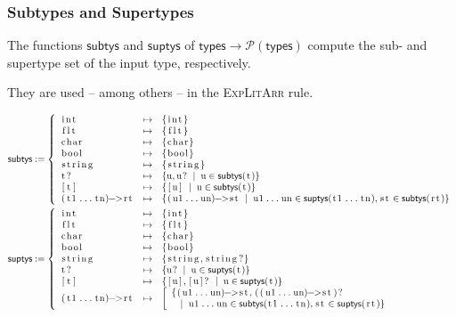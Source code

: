 \documentclass{article}
\newcommand{\code}[1]{\lstinline[columns=fixed]{#1}}
\newcommand{\mc}[1]{\textnormal{\code{#1}}}
\begin{document}
			\subsubsection{Subtypes and Supertypes}
			
				The functions $\mathsf{subtys}$ and $\mathsf{suptys}$ of $\mathsf{types}\to\mathcal{P}(\mathsf{types})$ compute the sub- and supertype set of the input type, respectively.
				
				They are used -- among others -- in the \textsc{ExpLitArr} rule.
				
				\begin{align*}
					\mathsf{subtys} &:=
						\left\{
							\begin{array}{lll}
								\mc{int} & \mapsto & \{\mc{int}\}\\
								\mc{flt} & \mapsto & \{\mc{flt}\}\\
								\mc{char} & \mapsto & \{\mc{char}\}\\
								\mc{bool} & \mapsto & \{\mc{bool}\}\\
								\mc{string} & \mapsto & \{\mc{string}\}\\
								\mc{t?} & \mapsto & \{\mc{u},\mc{u?} \;\mid\; \mc{u}\in\mathsf{subtys}(\mc{t})\}\\
								\mc{[t]} & \mapsto & \{\mc{[u]} \;\mid\; \mc{u}\in\mathsf{subtys}(\mc{t})\}\\
								\mc{(t1...tn)->rt} & \mapsto &
									\{\mc{(u1...un)->st} \;\mid\; \mc{u1...un}\in\mathsf{suptys}(\mc{t1...tn}),\mc{st}\in\mathsf{subtys}(\mc{rt})\}
							\end{array}
						\right.\\
					\mathsf{suptys} &:=
						\left\{
							\begin{array}{lll}
								\mc{int} & \mapsto & \{\mc{int}\}\\
								\mc{flt} & \mapsto & \{\mc{flt}\}\\
								\mc{char} & \mapsto & \{\mc{char}\}\\
								\mc{bool} & \mapsto & \{\mc{bool}\}\\
								\mc{string} & \mapsto & \{\mc{string},\mc{string?}\}\\
								\mc{t?} & \mapsto & \{\mc{u?} \;\mid\; \mc{u}\in\mathsf{suptys}(\mc{t})\}\\
								\mc{[t]} & \mapsto & \{\mc{[u]}, \mc{[u]?} \;\mid\; \mc{u}\in\mathsf{suptys}(\mc{t})\}\\
								\mc{(t1...tn)->rt} & \mapsto &
									\left[
									\begin{array}{l}
										\{\mc{(u1...un)->st},\mc{((u1...un)->st)?} \\\ \ \;\mid\; \mc{u1...un}\in\mathsf{subtys}(\mc{t1...tn}),\mc{st}\in\mathsf{suptys}(\mc{rt})\}
									\end{array}
									\right.
							\end{array}
						\right.
				\end{align*}
		
\end{document}
